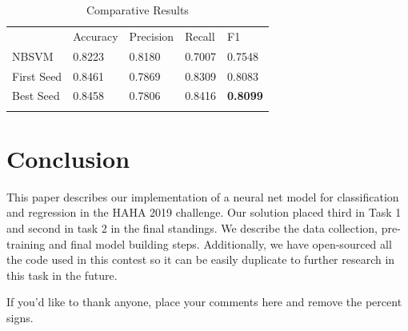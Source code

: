 \documentclass[smallextended]{svjour3}       %
\begin{document}
\begin{table}[ht]
	\caption{Comparative Results}
	\label{tab:tab_results}
	\begin{tabular}{lllll}
		\hline\noalign{\smallskip}
		 & Accuracy & Precision & Recall & F1 \\
		\noalign{\smallskip}\hline\noalign{\smallskip}
NBSVM &      0.8223 & 0.8180 & 0.7007 & 0.7548 \\
First Seed & 0.8461 & 0.7869 & 0.8309 & 0.8083 \\
Best Seed &  0.8458 & 0.7806 & 0.8416 & \textbf{0.8099} \\
		\noalign{\smallskip}\hline
	\end{tabular}
\end{table}

\section{Conclusion}
\label{sec:5}
This paper describes our implementation of a neural net model for classification and regression in the HAHA 2019 challenge.  Our solution placed third in Task 1 and second in task 2 in the final standings.  We describe the data collection, pre-training and final model building steps.  Additionally, we have open-sourced all the code used in this contest so it can be easily duplicate to further research in this task in the future.

\begin{acknowledgements}
If you'd like to thank anyone, place your comments here
and remove the percent signs.
\end{acknowledgements}


%
%



\end{document}
